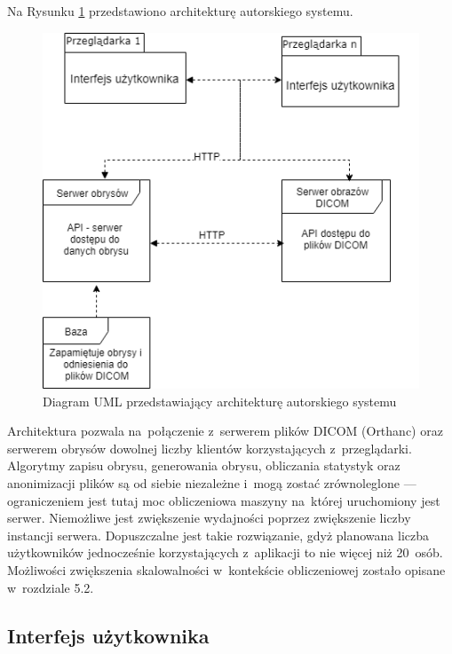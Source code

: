 \documentclass[a4paper,11pt,twoside,openright]{report}
\theoremstyle{definition}
\begin{document}
Na Rysunku \ref{fig:architektura} przedstawiono architekturę autorskiego systemu.

\begin{figure}[h]
	\center
	\includegraphics[width=1\textwidth]{architektura}
	\caption{Diagram UML przedstawiający architekturę autorskiego systemu}
    	\label{fig:architektura}
\end{figure}

Architektura pozwala na~połączenie z~serwerem plików DICOM (Orthanc) oraz serwerem
obrysów dowolnej liczby klientów korzystających z~przeglądarki. Algorytmy zapisu
obrysu, generowania obrysu, obliczania statystyk oraz anonimizacji plików są od
siebie niezależne i~mogą zostać zrównoleglone --- ograniczeniem jest tutaj moc
obliczeniowa maszyny na~której uruchomiony jest serwer. Niemożliwe jest zwiększenie
wydajności poprzez zwiększenie liczby instancji serwera. Dopuszczalne jest takie
rozwiązanie, gdyż planowana liczba użytkowników jednocześnie korzystających z~aplikacji
to nie więcej niż 20~osób. Możliwości zwiększenia skalowalności w~kontekście
obliczeniowej zostało opisane w~rozdziale 5.2.

\subsection {Interfejs użytkownika}
\end{document}
